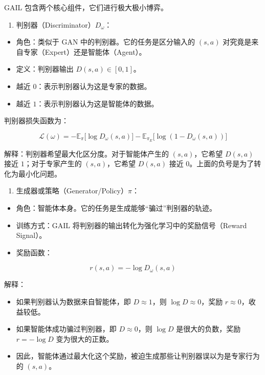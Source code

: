 GAIL 包含两个核心组件，它们进行极大极小博弈。

\begin{enumerate}
\def\labelenumi{\arabic{enumi}.}
\tightlist
\item
{}
  判别器（Discriminator）\(D_\omega\)：
\end{enumerate}

\begin{itemize}
\tightlist
\item
  角色：类似于 GAN 中的判别器。它的任务是区分输入的 \((s,a)\) 对究竟是来自专家（Expert）还是智能体（Agent）。
\item
  定义：判别器输出 \(D(s,a)\in[0,1]\)。
\item
  越近 \(0\)：表示判别器认为这是专家的数据。
\item
  越近 \(1\)：表示判别器认为这是智能体的数据。
\end{itemize}

判别器损失函数为：

\[
\mathcal{L}(\omega)
=
-
\mathbb{E}_{\pi}
\bigl[
\log D_\omega(s,a)
\bigr]
-
\mathbb{E}_{\pi_E}
\bigl[
\log(1-D_\omega(s,a))
\bigr]
\]

解释：判别器希望最大化区分度。对于智能体产生的 \((s,a)\)，它希望 \(D(s,a)\) 接近 \(1\)；对于专家产生的 \((s,a)\)，它希望 \(D(s,a)\) 接近 \(0\)。上面的负号是为了转化为最小化问题。

\begin{enumerate}
\def\labelenumi{\arabic{enumi}.}
\setcounter{enumi}{1}
\tightlist
\item
{}
  生成器或策略（Generator/Policy）\(\pi\)：
\end{enumerate}

\begin{itemize}
\tightlist
\item
  角色：智能体本身。它的任务是生成能够``骗过''判别器的轨迹。
\item
  训练方式：GAIL 将判别器的输出转化为强化学习中的奖励信号（Reward Signal）。
\item
{}
  奖励函数：
\end{itemize}

\[
r(s,a)
=
-
\log D_\omega(s,a)
\]

解释：

\begin{itemize}
\tightlist
\item
  如果判别器认为数据来自智能体，即 \(D\approx 1\)，则 \(\log D\approx 0\)，奖励 \(r\approx 0\)，收益较低。
\item
  如果智能体成功骗过判别器，即 \(D\approx 0\)，则 \(\log D\) 是很大的负数，奖励 \(r=-\log D\) 变为很大的正数。
\item
  因此，智能体通过最大化这个奖励，被迫生成那些让判别器误以为是专家行为的 \((s,a)\)。
\end{itemize}

